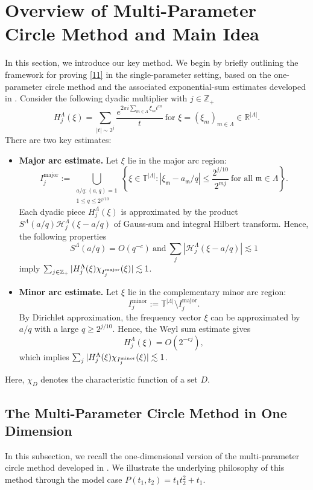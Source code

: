 \documentclass[11 pt,letterpaper]{amsart}
\theoremstyle{plain}
\theoremstyle{definition}
\theoremstyle{remark} \theoremstyle{exam} \theoremstyle{ob}
\numberwithin{equation}{section}
\begin{document}
\section{Overview of Multi-Parameter Circle Method and Main Idea}\label{sec34}In this section, we introduce our key method.
We begin by briefly outlining the framework for proving \eqref{11} in the single-parameter setting, based on the one-parameter circle method and the associated exponential-sum estimates developed in \cite{AO,B1,B2,B3,HR,SW2,V}.
  Consider the following dyadic multiplier with $j\in\mathbb{Z}_{+}$
$$ H^{\Lambda}_j(\xi)=\sum_{|t|\sim 2^j} \frac{e^{2\pi i \sum_{m\in \Lambda}\xi_mt^m}}{t} \ \text{for $\xi=(\xi_m)_{m\in\Lambda}\in \mathbb{R}^{|\Lambda|}$}.$$  
There are two key estimates:
\begin{itemize}
	\item[(1)] \textbf{Major arc estimate.} Let $\xi$ lie  in the major arc region:
	\[
	I^{\mathrm{major}}_j
	:=
	\bigcup_{\substack{a/q : (a,q)=1 \\ 1\le q \le 2^{j/10}}}
	\left\{
	\xi \in \mathbb{T}^{|\Lambda|} :
	|\xi_{\mathfrak{m}} - a_{\mathfrak{m}}/q| \le \frac{2^{j/10}}{2^{mj}}
	\ \text{for all } \mathfrak{m} \in \Lambda
	\right\}.
	\]
	Each dyadic piece $H_j^{\Lambda}(\xi)$ is approximated by the product  $S^{\Lambda}(a/q)\mathcal{H}^{\Lambda}_j(\xi-a/q)$ 
	of  Gauss-sum  and  integral Hilbert transform. Hence, the following properties  $$S^{\Lambda}(a/q)=O(q^{-c})\ \text{and}\  \sum_j|\mathcal{H}^{\Lambda}_j(\xi-a/q) |\lesssim 1$$ imply $\sum_{j\in\mathbb{Z}_+} |H_j^{\Lambda}(\xi)\chi_{I_j^{\rm{major}}}(\xi) |\lesssim 1$.
	\item[(2)] \textbf{Minor arc estimate.}
	Let $\xi$ lie  in the complementary minor arc region:
	\[
	I^{\mathrm{minor}}_j := \mathbb{T}^{|\Lambda|} \setminus I^{\mathrm{major}}_j.
	\]
	By Dirichlet approximation, the frequency vector $\xi$ can be approximated by $a/q$ with a large $q\ge 2^{j/10}$. Hence, the Weyl sum estimate gives  $$H_j^{\Lambda}(\xi)=O(2^{-cj}),$$ which implies
	$\sum_{j} |H_j^{\Lambda}(\xi)\chi_{I_j^{\rm{minor}}}(\xi) |\lesssim 1$.
\end{itemize}
\bigskip
Here, $\chi_D$ denotes the characteristic function of a set $D$.
 \subsection{The Multi-Parameter Circle Method in One Dimension}In this subsection, we recall the one-dimensional version of the multi-parameter circle method developed in \cite{KS}. We illustrate the underlying philosophy of this method through the model case $P(t_1,t_2)=t_1t_2^{2}+t_1$. 
 
\end{document}
